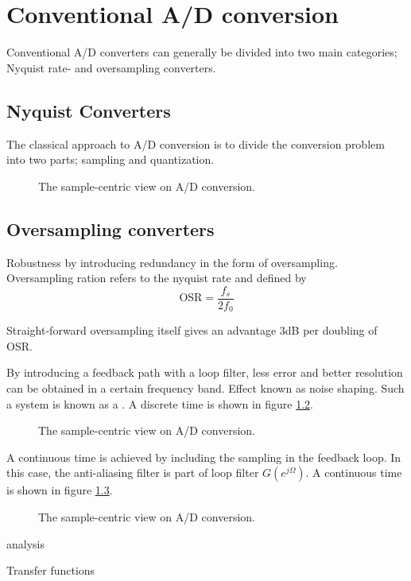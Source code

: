 
\chapter{Conventional A/D conversion}
\label{sec:conventional_adc}
Conventional A/D converters can generally be divided into two main categories; Nyquist rate- and oversampling converters.

\section{Nyquist Converters}
\label{subsec:nyquist_adc}
The classical approach to A/D conversion is to divide the conversion problem into two parts; sampling and quantization.
\begin{figure}[htbp]
    
    \centering
    \caption{The sample-centric view on A/D conversion.}
    \label{fig:sample_centric_adc}
\end{figure}

\section{Oversampling converters}
\label{subsec:oversampling_adc}
Robustness by introducing redundancy in the form of oversampling. Oversampling ration refers to the nyquist rate and defined by
\begin{equation}
    \text{OSR} = \frac{f_s}{2f_0}
\end{equation}

Straight-forward oversampling itself gives an advantage 3dB per doubling of OSR.

By introducing a feedback path with a loop filter, less error and better resolution can be obtained in a certain frequency band. Effect known as noise shaping. Such a system is known as a \sdmod. A discrete time \sdmod is shown in figure \ref{fig:dtsdmod}.

\begin{figure}[htbp]
    
    \centering
    \caption{The sample-centric view on A/D conversion.}
    \label{fig:dtsdmod}
\end{figure}

A continuous time \sdmod is achieved by including the sampling in the feedback loop. In this case, the anti-aliasing filter is part of loop filter $G(e^{j\Omega})$. A continuous time \sdmod is shown in figure \ref{fig:ctsdmod}.

\begin{figure}[htbp]
    
    \centering
    \caption{The sample-centric view on A/D conversion.}
    \label{fig:ctsdmod}
\end{figure}

\sdmod analysis


Transfer functions

